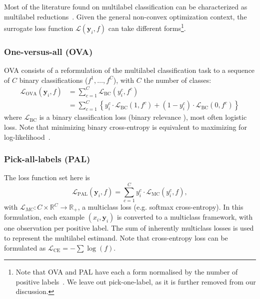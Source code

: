Most of the literature found on multilabel classification can be characterized as multilabel reductions~\cite{multilabelReduction}. Given the general non-convex optimization context, the surrogate loss function $\mathcal{L}(\mathbf{y}_i, f)$ can take different forms\footnote{Note that OVA and PAL have each a form normalised by the number of positive labels~\cite{multilabelReduction}. We leave out pick-one-label, as it is further removed from our discussion.}. 

\subsubsection*{One-versus-all (OVA)}
OVA consists of a reformulation of the multilabel classification task to a sequence of $C$ binary classifications ($f^1, \ldots, f^C$), with $C$ the number of classes:
%
\begin{equation}
\begin{aligned}
\mathcal{L}_{\mathrm{OVA}}(\mathbf{y}_i, f) &= \sum_{c = 1}^C \mathcal{L}_{\mathrm{BC}}\left(y_i^{c}, f^{c}\right)\\
&=\sum_{c = 1}^C \left\{y_{i}^c \cdot \mathcal{L}_{\mathrm{BC}}\left(1, f^c \right)+\left(1-y_{i}^c \right) \cdot \mathcal{L}_{\mathrm{BC}}\left(0, f^c \right)\right\}
\end{aligned}
\end{equation}
%
where $\mathcal{L}_{\mathrm{BC}}$ is a binary classification loss (binary relevance \cite{OVA1, hammingLoss, OVA2}), most often logistic loss.  Note that minimizing binary cross-entropy is equivalent to maximizing for log-likelihood~\cite[\S4.3.4]{Bishop}.

\subsubsection*{Pick-all-labels (PAL)}
The loss function set here is
%
\vspace{-0.5\baselineskip}
\begin{equation}
\mathcal{L}_{\mathrm{PAL}}(\mathbf{y}_i, f) = \sum_{c = 1}^C y_{i}^c \cdot \mathcal{L}_{\mathrm{MC}}(y_i^c, f),
\end{equation}
%
with $\mathcal{L}_{MC} : C \times \mathbb{R}^{C} \rightarrow \mathbb{R}_{+}$, a multiclass loss (e.g. softmax cross-entropy). In this formulation, each example $(x_i, \mathbf{y}_i)$ is converted to a multiclass framework, with one observation per positive label. The sum of inherently multiclass losses is used to represent the multilabel estimand. Note that cross-entropy loss can be formulated as \(\mathcal{L}_{\text {CE}}=-\sum \log \left(f \right)\).

